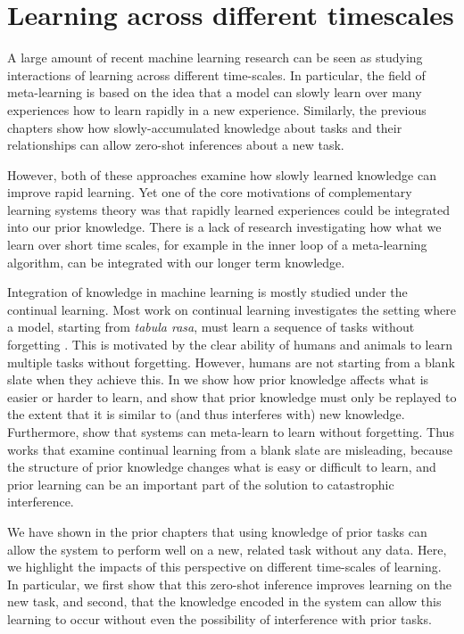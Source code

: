 \chapter{Learning across different timescales} \label{chapter:timescales}

A large amount of recent machine learning research can be seen as studying interactions of learning across different time-scales. In particular, the field of meta-learning is based on the idea that a model can slowly learn over many experiences how to learn rapidly in a new experience. Similarly, the previous chapters show how slowly-accumulated knowledge about tasks and their relationships can allow zero-shot inferences about a new task. \par 

However, both of these approaches examine how slowly learned knowledge can improve rapid learning. Yet one of the core motivations of complementary learning systems theory was that rapidly learned experiences could be integrated into our prior knowledge. There is a lack of research investigating how what we learn over short time scales, for example in the inner loop of a meta-learning algorithm, can be integrated with our longer term knowledge. \par 

Integration of knowledge in machine learning is mostly studied under the continual learning. Most work on continual learning investigates the setting where a model, starting from \emph{tabula rasa}, must learn a sequence of tasks without forgetting \citep{Ven2018, Atkinson2018}. This is motivated by the clear ability of humans and animals to learn multiple tasks without forgetting. However, humans are not starting from a blank slate when they achieve this. In \citet{McClelland2020} we show how prior knowledge affects what is easier or harder to learn, and show that prior knowledge must only be replayed to the extent that it is similar to (and thus interferes with) new knowledge. Furthermore, \citet{Velez2017} show that systems can meta-learn to learn without forgetting. Thus works that examine continual learning from a blank slate are misleading, because the structure of prior knowledge changes what is easy or difficult to learn, and prior learning can be an important part of the solution to catastrophic interference. \par 

We have shown in the prior chapters that using knowledge of prior tasks can allow the system to perform well on a new, related task without any data. Here, we highlight the impacts of this perspective on different time-scales of learning. In particular, we first show that this zero-shot inference improves learning on the new task, and second, that the knowledge encoded in the system can allow this learning to occur without even the possibility of interference with prior tasks. \par  

